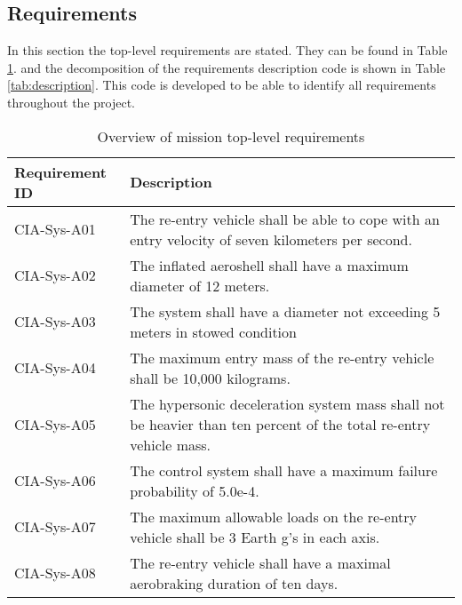 \subsection{Requirements} \label{subsec:systemrequirements}
In this section the top-level requirements are stated. They can be found in Table \ref{tab:requirements}. and the decomposition of the requirements description code is shown in Table \ref{tab:description}. This code is developed to be able to identify all requirements throughout the project.
\vspace{-4mm}
\begin{table}[H]
	\caption{Overview of mission top-level requirements}
	\begin{tabular}{|p{}|p{}|}
    \hline
    Requirement ID          & Description                                                                                                      \\ \hline \hline
    CIA-Sys-A01 & The re-entry vehicle shall be able to cope with an entry velocity of seven kilometers per second.                \\ \hline
    CIA-Sys-A02 & The inflated aeroshell shall have a maximum diameter of 12 meters.                                               \\ \hline
    CIA-Sys-A03 & The system shall have a diameter not exceeding 5 meters in stowed condition                                                          \\ \hline
    CIA-Sys-A04 & The maximum entry mass of the re-entry vehicle shall be 10,000 kilograms.                                         \\ \hline
    CIA-Sys-A05 & The hypersonic deceleration system mass shall not be heavier than ten percent of the total re-entry vehicle mass. \\ \hline
    CIA-Sys-A06 & The control system shall have a maximum failure probability of 5.0e-4.                                           \\ \hline
    CIA-Sys-A07 & The maximum allowable loads on the re-entry vehicle shall be 3 Earth g's in each axis.                            \\ \hline
    CIA-Sys-A08 & The re-entry vehicle shall have a maximal aerobraking duration of ten days.                                      \\ \hline
    \end{tabular}
    \label{tab:requirements}
\end{table}

